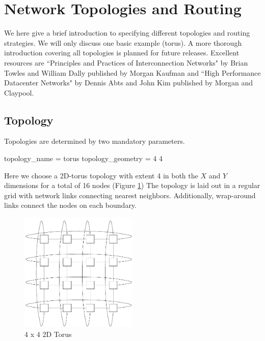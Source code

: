 
\section{Network Topologies and Routing}
\label{sec:tutorial:topology}
We here give a brief introduction to specifying different topologies and routing strategies.  
We will only discuss one basic example (torus).  
A more thorough introduction covering all topologies is planned for future releases.
Excellent resources are ``Principles and Practices of Interconnection Networks" by Brian Towles and William Dally published by Morgan Kaufman and ``High Performance Datacenter Networks" by Dennis Abts and John Kim published by Morgan and Claypool.

\subsection{Topology}
\label{subsec:tutorial:topology}

Topologies are determined by two mandatory parameters.
\begin{ViFile}
topology_name = torus
topology_geometry = 4 4
\end{ViFile}
Here we choose a 2D-torus topology with extent 4 in both the $X$ and $Y$ dimensions for a total of 16 nodes (Figure \ref{fig:hdtorus:basic})
The topology is laid out in a regular grid with network links connecting nearest neighbors.  
Additionally, wrap-around links connect the nodes on each boundary.  
\begin{figure}[h]
\centering
\includegraphics[width=0.5\textwidth]{figures/tikz/torus/torus.pdf}
\caption{4 x 4 2D Torus}
\label{fig:hdtorus:basic}
\end{figure}


